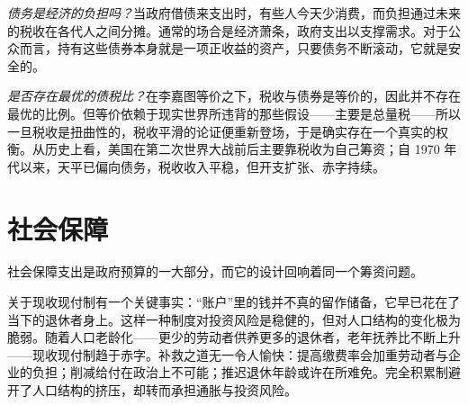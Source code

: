 \emph{债务是经济的负担吗？}当政府借债来支出时，有些人今天少消费，而负担通过未来的税收在各代人之间分摊。通常的场合是经济萧条，政府支出以支撑需求。对于公众而言，持有这些债券本身就是一项正收益的资产，只要债务不断滚动，它就是安全的。

\emph{是否存在最优的债税比？}在李嘉图等价之下，税收与债券是等价的，因此并不存在最优的比例。但等价依赖于现实世界所违背的那些假设——主要是总量税——所以一旦税收是扭曲性的，税收平滑的论证便重新登场，于是确实存在一个真实的权衡。从历史上看，美国在第二次世界大战前后主要靠税收为自己筹资；自 1970 年代以来，天平已偏向债务，税收收入平稳，但开支扩张、赤字持续。

\section{社会保障}

社会保障支出是政府预算的一大部分，而它的设计回响着同一个筹资问题。


关于现收现付制有一个关键事实：“账户”里的钱并不真的留作储备，它早已花在了当下的退休者身上。这样一种制度对投资风险是稳健的，但对人口结构的变化极为脆弱。随着人口老龄化——更少的劳动者供养更多的退休者，老年抚养比不断上升——现收现付制趋于赤字。补救之道无一令人愉快：提高缴费率会加重劳动者与企业的负担；削减给付在政治上不可能；推迟退休年龄或许在所难免。完全积累制避开了人口结构的挤压，却转而承担通胀与投资风险。
